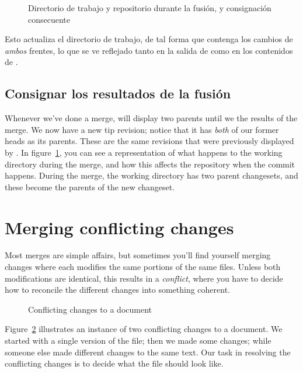 \begin{figure}[ht]
  \centering
  \caption{Directorio de trabajo y repositorio durante la fusión, y
  consignación consecuente}
  \label{fig:tour-merge:merge}
\end{figure}

Esto actualiza el directorio de trabajo, de tal forma que contenga los
cambios de \emph{ambos} frentes, lo que se ve reflejado tanto en la
salida de  como en los contenidos de .

\subsection{Consignar los resultados de la fusión}

Whenever we've done a merge,  will display two parents
until we  the results of the merge.
We now have a new tip revision; notice that it has \emph{both} of
our former heads as its parents.  These are the same revisions that
were previously displayed by .
In figure~\ref{fig:tour-merge:merge}, you can see a representation of
what happens to the working directory during the merge, and how this
affects the repository when the commit happens.  During the merge, the
working directory has two parent changesets, and these become the
parents of the new changeset.

\section{Merging conflicting changes}

Most merges are simple affairs, but sometimes you'll find yourself
merging changes where each modifies the same portions of the same
files.  Unless both modifications are identical, this results in a
\emph{conflict}, where you have to decide how to reconcile the
different changes into something coherent.

\begin{figure}[ht]
  \centering
  \caption{Conflicting changes to a document}
  \label{fig:tour-merge:conflict}
\end{figure}

Figure~\ref{fig:tour-merge:conflict} illustrates an instance of two
conflicting changes to a document.  We started with a single version
of the file; then we made some changes; while someone else made
different changes to the same text.  Our task in resolving the
conflicting changes is to decide what the file should look like.

